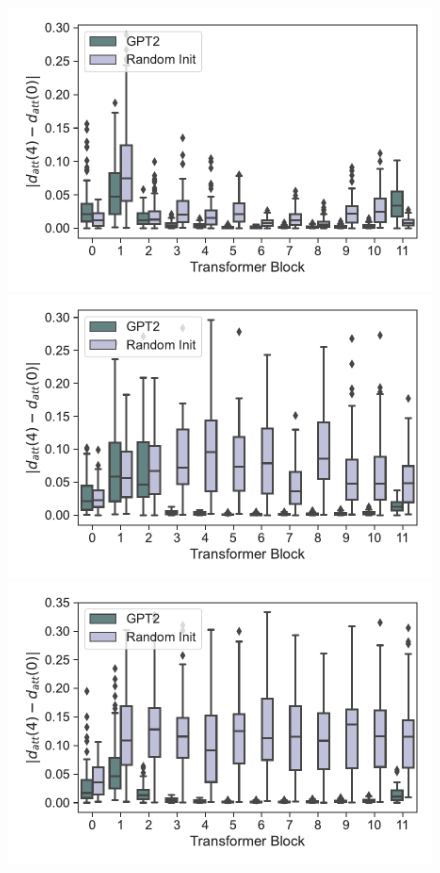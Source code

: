 \documentclass{article}
\begin{document}
\begin{figure}[H]
    \centering
    \begin{minipage}[b]{0.32\linewidth}
        \includegraphics[width=\linewidth]{figs/att_dist_diff_0_10_gpt2_dt_hopper_medium_666_K1.pdf}
    \end{minipage}
    \begin{minipage}[b]{0.32\linewidth}
        \includegraphics[width=\linewidth]{figs/att_dist_diff_0_10_gpt2_dt_halfcheetah_medium_666_K1.pdf}
    \end{minipage}
    \begin{minipage}[b]{0.32\linewidth}
        \includegraphics[width=\linewidth]{figs/att_dist_diff_0_10_gpt2_dt_walker2d_medium_666_K1.pdf}

\end{minipage}
\end{figure}
\end{document}
